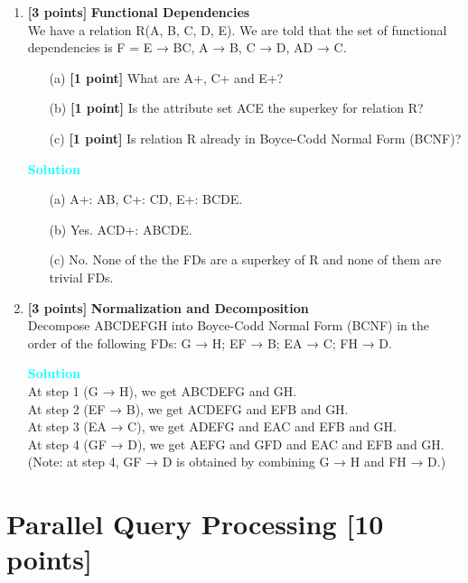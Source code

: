 \documentclass[10pt]{article}
\newenvironment{solution}
    { \begin{mdframed}[backgroundcolor=gray!10] \textcolor{cyan}{\textbf{Solution}} \\}
    {  \end{mdframed}}
\begin{document}
\begin{enumerate}
	\item \textbf{[3 points]} \textbf{Functional Dependencies} \\
	      We have a relation R(A, B, C, D, E). We are told that the set of functional dependencies is
	      F = {E → BC, A → B, C → D, AD → C}.
	      \begin{itemize}
		      \item[(a)] \textbf{[1 point]} What are A+, C+ and E+?
		      \item[(b)] \textbf{[1 point]} Is the attribute set ACE the superkey for relation R?
		      \item[(c)] \textbf{[1 point]} Is relation R already in Boyce-Codd Normal Form (BCNF)?
	      \end{itemize}
	      \begin{solution}
		      \begin{itemize}
			      \item[(a)] A+: AB, C+: CD, E+: BCDE.
			      \item[(b)] Yes. ACD+: ABCDE.
			      \item[(c)] No. None of the the FDs are a superkey of R and none of them are trivial FDs.
		      \end{itemize}
	      \end{solution}

	\item \textbf{[3 points]} \textbf{Normalization and Decomposition} \\
	      Decompose ABCDEFGH into Boyce-Codd Normal Form (BCNF) in the order of the following FDs:
	      G → H; EF → B; EA → C; FH → D.
	      \begin{solution}
		      At step 1 (G → H), we get ABCDEFG and GH. \\
		      At step 2 (EF → B), we get ACDEFG and EFB and GH. \\
		      At step 3 (EA → C), we get ADEFG and EAC and EFB and GH. \\
			  At step 4 (GF → D), we get AEFG and GFD and EAC and EFB and GH. \\
			  (Note: at step 4, GF → D is obtained by combining G → H and FH → D.)
	      \end{solution}


\end{enumerate}



\newpage
\section{Parallel Query Processing \textbf{[10 points]}}
\end{document}

